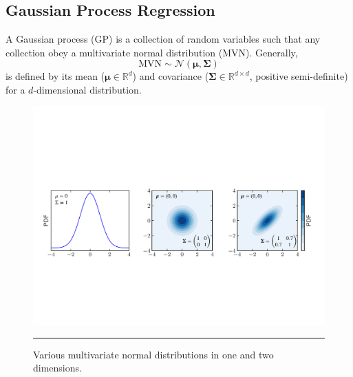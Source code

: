 \documentclass[a4paper,10.5pt]{article}
\begin{document}
\subsection{Gaussian Process Regression}

A Gaussian process (GP) is a collection of random variables such that any collection obey a multivariate normal distribution (MVN). Generally,
\begin{equation}
	\text{MVN} \sim \mathcal{N}(\boldsymbol{\mu}, \boldsymbol{\Sigma})
\end{equation}
is defined by its mean ($\boldsymbol{\mu} \in \mathbb{R}^d$) and covariance ($\boldsymbol{\Sigma} \in \mathbb{R}^{d \times d}$, positive semi-definite) for a $d$-dimensional distribution.%

\begin{figure}[h!]
	\centering
	\includegraphics[width=\textwidth]{mvn_annotated.pdf}
	\vspace{0.1cm}
	\hrule 
	\caption{Various multivariate normal distributions in one and two dimensions.}
\end{figure}
\end{document}
